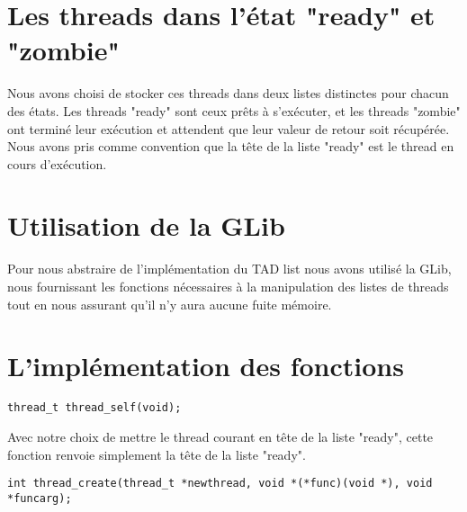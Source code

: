 \documentclass[12pt]{article}
\begin{document}
\section {Les threads dans l'état "ready" et "zombie"}

Nous avons choisi de stocker ces threads dans deux listes distinctes
pour chacun des états. Les threads "ready" sont ceux prêts à
s'exécuter, et les threads "zombie" ont terminé leur exécution et attendent
que leur valeur de retour soit récupérée.\\
Nous avons pris comme convention que la tête de la liste "ready" est
le thread en cours d'exécution.

\section {Utilisation de la GLib}

Pour nous abstraire de l'implémentation du TAD list nous avons utilisé
la GLib, nous fournissant les fonctions nécessaires à la manipulation
des listes de threads tout en nous assurant qu'il n'y aura aucune
fuite mémoire.

\section {L'implémentation des fonctions}

\begin{verbatim}
thread_t thread_self(void);
\end{verbatim}
Avec notre choix de mettre le thread courant en tête de la liste "ready", 
cette fonction renvoie simplement la tête de la liste "ready".
~~\\
\begin{verbatim}
int thread_create(thread_t *newthread, void *(*func)(void *), void *funcarg);
\end{verbatim}
\end{document}
